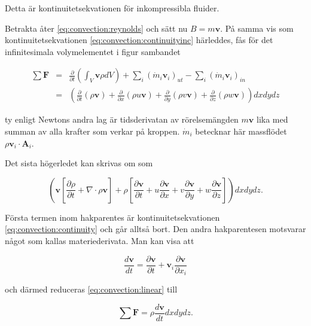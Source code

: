 Detta är kontinuitetsekvationen för inkompressibla fluider.

Betrakta åter \eqref{eq:convection:reynolds} och sätt nu $B = m\mathbf{v}$. På samma vis som kontinuitetsekvationen \eqref{eq:convection:continuityinc} härleddes, fås för det infinitesimala volymelementet i figur sambandet

\begin{eqnarray}
\label{eq:convection:linear}
\sum \mathbf{F} & = & \frac{\partial}{\partial t} \left( \int_V \mathbf{v} \rho dV \right) + \sum_i \left( \dot{m}_i \mathbf{v}_i \right)_{ut} - \sum_i \left( \dot{m}_i \mathbf{v}_i \right)_{in}\nonumber\\
& = &\left(\frac{\partial}{\partial t} \left( \rho\mathbf{v} \right) + \frac{\partial}{\partial x}\left( \rho u \mathbf{v}\right) + \frac{\partial}{\partial y}\left( \rho v \mathbf{v}\right) + \frac{\partial}{\partial z}\left( \rho w \mathbf{v}\right)\right)dxdydz
\end{eqnarray}

ty enligt Newtons andra lag är tidsderivatan av rörelsemängden $m\mathbf{v}$ lika med summan av alla krafter som verkar på kroppen. $\dot{m}_i$ betecknar här massflödet $\rho\mathbf{v}_i\cdot\mathbf{A}_i$.

Det sista högerledet kan skrivas om som

\begin{equation}
\left( \mathbf{v}\left[ \frac{\partial \rho}{\partial t} + \nabla\cdot \rho \mathbf{v}\right] + \rho\left[ \frac{\partial \mathbf{v}}{\partial t} + u\frac{\partial\mathbf{v}}{\partial x} + v\frac{\partial\mathbf{v}}{\partial y} + w\frac{\partial\mathbf{v}}{\partial z} \right]\right)dxdydz.
\end{equation}

Första termen inom hakparentes är kontinuitetsekvationen \eqref{eq:convection:continuity} och går alltså bort. Den andra hakparentesen motsvarar något som kallas materiederivata. Man kan visa att 

\begin{equation}
\label{eq:convection:material}
\frac{d\mathbf{v}}{dt} = \frac{\partial \mathbf{v}}{\partial t} + \mathbf{v}_i\frac{\partial \mathbf{v}}{\partial x_i}
\end{equation}

och därmed reduceras \eqref{eq:convection:linear} till

\begin{equation}
\label{eq:convection:linearfinal}
\sum \mathbf{F} = \rho \frac{d\mathbf{v}}{dt}dxdydz.
\end{equation}

